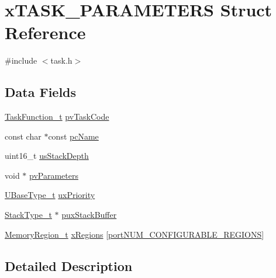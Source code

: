 \hypertarget{structx_t_a_s_k___p_a_r_a_m_e_t_e_r_s}{}\section{x\+T\+A\+S\+K\+\_\+\+P\+A\+R\+A\+M\+E\+T\+E\+RS Struct Reference}
\label{structx_t_a_s_k___p_a_r_a_m_e_t_e_r_s}


{\ttfamily \#include $<$task.\+h$>$}

\subsection*{Data Fields}
\begin{DoxyCompactItemize}
\item 
\hyperlink{projdefs_8h_a9b32502ff92c255c686dacde53c1cba0}{Task\+Function\+\_\+t} \hyperlink{structx_t_a_s_k___p_a_r_a_m_e_t_e_r_s_a7527993402054565cda38251c8922880}{pv\+Task\+Code}
\item 
const char $\ast$const \hyperlink{structx_t_a_s_k___p_a_r_a_m_e_t_e_r_s_a7b3e5583acf9de8bacac572a42246459}{pc\+Name}
\item 
uint16\+\_\+t \hyperlink{structx_t_a_s_k___p_a_r_a_m_e_t_e_r_s_aa07bfb2214d78ba7a30592fa7b75af18}{us\+Stack\+Depth}
\item 
void $\ast$ \hyperlink{structx_t_a_s_k___p_a_r_a_m_e_t_e_r_s_accbb9f4de75b5b5be750198b52390c7f}{pv\+Parameters}
\item 
\hyperlink{portmacro_8h_a646f89d4298e4f5afd522202b11cb2e6}{U\+Base\+Type\+\_\+t} \hyperlink{structx_t_a_s_k___p_a_r_a_m_e_t_e_r_s_aa1aff14035db645e2bdcc85b3cdc9bab}{ux\+Priority}
\item 
\hyperlink{portmacro_8h_a84e9a8ba132feed0b2401c1f4e2ac63c}{Stack\+Type\+\_\+t} $\ast$ \hyperlink{structx_t_a_s_k___p_a_r_a_m_e_t_e_r_s_a946c525d3765369780538f9bc3f3586d}{pux\+Stack\+Buffer}
\item 
\hyperlink{task_8h_af609504de4d78ff6f71477ae47c66e51}{Memory\+Region\+\_\+t} \hyperlink{structx_t_a_s_k___p_a_r_a_m_e_t_e_r_s_ae8b97c6b7a344bf09b066b0844844d66}{x\+Regions} \mbox{[}\hyperlink{portable_8h_aca7e1a8a568a38b74cc9db10c8efebda}{port\+N\+U\+M\+\_\+\+C\+O\+N\+F\+I\+G\+U\+R\+A\+B\+L\+E\+\_\+\+R\+E\+G\+I\+O\+NS}\mbox{]}
\end{DoxyCompactItemize}


\subsection{Detailed Description}


